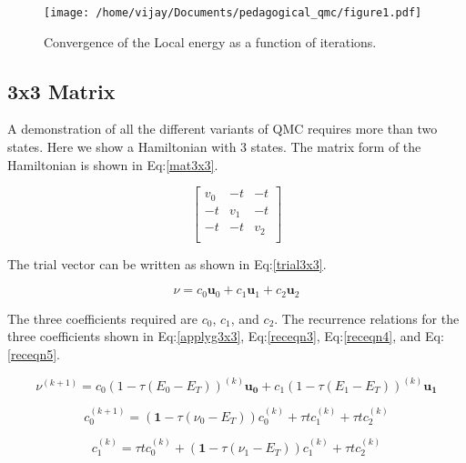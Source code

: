 \documentclass[11pt]{article}
\begin{document}
\begin{figure}[htbp]
\centering
\texttt{[image: /home/vijay/Documents/pedagogical\_qmc/figure1.pdf]}
\caption{\label{figure1}Convergence of the Local energy as a function of iterations.}
\end{figure}

\subsection{3x3 Matrix}
\label{sec:org4a5f57d}

A demonstration of all the different variants of QMC requires more than two states. Here we show a Hamiltonian with 3 states. The matrix form of the Hamiltonian is shown in Eq:\ref{mat3x3}.

\begin{equation}
\begin{bmatrix}
 v_0 & -t & -t \\
 -t & v_1 & -t \\
 -t & -t & v_2 \\
\end{bmatrix}
\label{mat3x3}
\end{equation}

The trial vector can be written as shown in Eq:\ref{trial3x3}.

\begin{equation}
\label{trial3x3}
\nu = c_0\mathbf{u}_0 + c_1\mathbf{u}_1 + c_2\mathbf{u}_2
\end{equation}

The three coefficients required are \(c_0\), \(c_1\), and \(c_2\). The recurrence relations for
the three coefficients shown in Eq:\ref{applyg3x3}, Eq:\ref{receqn3}, Eq:\ref{receqn4}, and Eq:\ref{receqn5}.

\begin{equation}
\label{applyg3x3}
\nu^{(k+1)} = c_0 (1-\tau(E_0-E_T))^{(k)}\mathbf{u_0} + c_1 (1-\tau(E_1-E_T))^{(k)}\mathbf{u_1}
\end{equation}

\begin{equation}
\label{receqn3}
c^{(k+1)}_0 =  \left(\mathbf{1}-\tau\left(\nu_0 - E_T\right)\right)c^{(k)}_0 + \tau t c^{(k)}_1 + \tau t c^{(k)}_2
\end{equation}

\begin{equation}
\label{receqn4}
c^{(k)}_1 = \tau t c^{(k)}_0 + \left(\mathbf{1}-\tau\left(\nu_1 - E_T\right)\right)c^{(k)}_1 + \tau t c^{(k)}_2
\end{equation}
\end{document}

